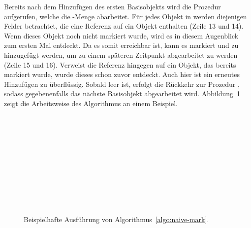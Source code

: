 Bereits nach dem Hinzufügen des ersten Basisobjekts wird die Prozedur  aufgerufen, welche die -Menge abarbeitet.
Für jedes Objekt in  werden diejenigen Felder betrachtet, die eine Referenz auf ein Objekt enthalten (Zeile 13 und 14).
Wenn dieses Objekt noch nicht markiert wurde, wird es in diesem Augenblick zum ersten Mal entdeckt.
Da es somit erreichbar ist, kann es markiert und zu  hinzugefügt werden, um zu einem späteren Zeitpunkt abgearbeitet zu werden (Zeile 15 und 16).
Verweist die Referenz hingegen auf ein Objekt, das bereits markiert wurde, wurde dieses schon zuvor entdeckt.
Auch hier ist ein erneutes Hinzufügen zu  überflüssig.
Sobald  leer ist, erfolgt die Rückkehr zur Prozedur , sodass gegebenenfalls das nächste Basisobjekt abgearbeitet wird.
Abbildung~\ref{fig:mark-example} zeigt die Arbeitsweise des Algorithmus an einem Beispiel.

\begin{figure}[H] \newcommand{\markexscale}{0.85} \newcommand{\markexspace}{0.7cm}
	\centering
	\begin{subfigure}[t]{0.45\textwidth}
		\centering
		
	\end{subfigure}~\hspace{\markexspace}~
	\begin{subfigure}[t]{0.45\textwidth}
		\centering
		
	\end{subfigure}\\[1cm]
	\begin{subfigure}[t]{0.45\textwidth}
		\centering
		
	\end{subfigure}~\hspace{\markexspace}~
	\begin{subfigure}[t]{0.45\textwidth}
		\centering
		
	\end{subfigure}\\[1cm]
	\begin{subfigure}[t]{0.45\textwidth}
		\centering
		
	\end{subfigure}~\hspace{\markexspace}~
	\begin{subfigure}[t]{0.45\textwidth}
		\centering
		
	\end{subfigure}\\[0.5cm]
	\caption[Beispielhafte Ausführung der Markierungsphase]{Beispielhafte Ausführung von Algorithmus~\ref{algo:naive-mark}.}
	\label{fig:mark-example}
\end{figure}

